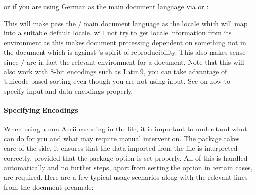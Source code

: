 \documentclass{ltxdockit}[2011/03/25]
\newcommand*{\biber}{\sty{biber}\xspace}
\newcommand*{\biblatex}{\sty{biblatex}\xspace}
\begin{document}
\begin{ltxexample}
\usepackage[sortlocale=de]{biblatex}
\end{ltxexample}
%
or if you are using German as the main document language via  or :

\begin{ltxexample}
\usepackage[sortlocale=auto]{biblatex}
\end{ltxexample}
%
This will make \biblatex pass the / main document language
as the locale which \biber will map into a suitable default locale. \biber
will not try to get locale information from its environment as this makes
document processing dependent on something not in the document which is
against \tex's spirit of reproducibility. This also makes sense since
/ are in fact the relevant environment for a document. Note
that this will also work with 8-bit encodings such as Latin\,9, \ie you can
take advantage of Unicode-based sorting even though you are not using \utf
input. See  on how to specify input and data
encodings properly.

\paragraph{Specifying Encodings}
\label{bib:cav:enc:enc}
When using a non-Ascii encoding in the  file, it is important to understand what \biblatex can do for you and what may require manual intervention. The package takes care of the \latex side, \ie it ensures that the data imported from the  file is interpreted correctly, provided that the  package option is set properly. All of this is handled automatically and no further steps, apart from setting the  option in certain cases, are required. Here are a few typical usage scenarios along with the relevant lines from the document preamble:
\end{document}
